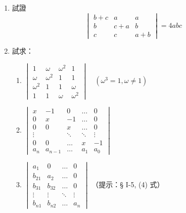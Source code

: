\begin{enumerate}[label=\arabic*., leftmargin=2em]
  \item 試證
  \[ \begin{vmatrix}
  b+c & a & a \\
  b & c+a & b \\
  c & c & a+b
  \end{vmatrix} = 4abc \]

  \item 試求：
  \begin{enumerate}[label=(\roman*)]
    \item $\begin{vmatrix}
    1 & \omega & \omega^2 & 1 \\
    \omega & \omega^2 & 1 & 1 \\
    \omega^2 & 1 & 1 & \omega \\
    1 & 1 & \omega & \omega^2
    \end{vmatrix} \quad (\omega^3=1, \omega \ne 1)$
    \item $\begin{vmatrix}
    x & -1 & 0 & \dots & 0 \\
    0 & x & -1 & \dots & 0 \\
    0 & 0 & x & \dots & 0 \\
    \vdots & & \ddots & \ddots & \vdots \\
    0 & 0 & \dots & x & -1 \\
    a_n & a_{n-1} & \dots & a_1 & a_0
    \end{vmatrix}$
    \item $\begin{vmatrix}
    a_1 & 0 & \dots & 0 \\
    b_{21} & a_2 & \dots & 0 \\
    b_{31} & b_{32} & \dots & 0 \\
    \vdots & \vdots & \ddots & \vdots \\
    b_{n1} & b_{n2} & \dots & a_n
    \end{vmatrix}$ （提示：§ I-5, (4) 式）
  \end{enumerate}


\end{enumerate}
